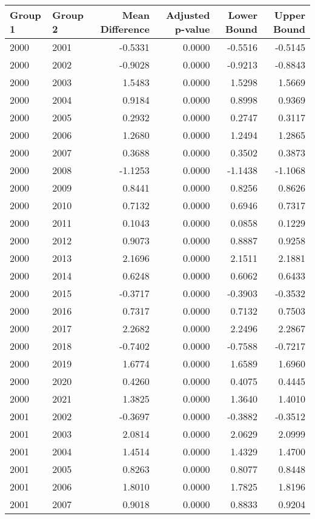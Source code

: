 \begin{tabular}{llrrrr}
\toprule
Group 1 & Group 2 & Mean Difference & Adjusted p-value & Lower Bound & Upper Bound \\
\midrule
2000 & 2001 & -0.5331 & 0.0000 & -0.5516 & -0.5145 \\
2000 & 2002 & -0.9028 & 0.0000 & -0.9213 & -0.8843 \\
2000 & 2003 & 1.5483 & 0.0000 & 1.5298 & 1.5669 \\
2000 & 2004 & 0.9184 & 0.0000 & 0.8998 & 0.9369 \\
2000 & 2005 & 0.2932 & 0.0000 & 0.2747 & 0.3117 \\
2000 & 2006 & 1.2680 & 0.0000 & 1.2494 & 1.2865 \\
2000 & 2007 & 0.3688 & 0.0000 & 0.3502 & 0.3873 \\
2000 & 2008 & -1.1253 & 0.0000 & -1.1438 & -1.1068 \\
2000 & 2009 & 0.8441 & 0.0000 & 0.8256 & 0.8626 \\
2000 & 2010 & 0.7132 & 0.0000 & 0.6946 & 0.7317 \\
2000 & 2011 & 0.1043 & 0.0000 & 0.0858 & 0.1229 \\
2000 & 2012 & 0.9073 & 0.0000 & 0.8887 & 0.9258 \\
2000 & 2013 & 2.1696 & 0.0000 & 2.1511 & 2.1881 \\
2000 & 2014 & 0.6248 & 0.0000 & 0.6062 & 0.6433 \\
2000 & 2015 & -0.3717 & 0.0000 & -0.3903 & -0.3532 \\
2000 & 2016 & 0.7317 & 0.0000 & 0.7132 & 0.7503 \\
2000 & 2017 & 2.2682 & 0.0000 & 2.2496 & 2.2867 \\
2000 & 2018 & -0.7402 & 0.0000 & -0.7588 & -0.7217 \\
2000 & 2019 & 1.6774 & 0.0000 & 1.6589 & 1.6960 \\
2000 & 2020 & 0.4260 & 0.0000 & 0.4075 & 0.4445 \\
2000 & 2021 & 1.3825 & 0.0000 & 1.3640 & 1.4010 \\
2001 & 2002 & -0.3697 & 0.0000 & -0.3882 & -0.3512 \\
2001 & 2003 & 2.0814 & 0.0000 & 2.0629 & 2.0999 \\
2001 & 2004 & 1.4514 & 0.0000 & 1.4329 & 1.4700 \\
2001 & 2005 & 0.8263 & 0.0000 & 0.8077 & 0.8448 \\
2001 & 2006 & 1.8010 & 0.0000 & 1.7825 & 1.8196 \\
2001 & 2007 & 0.9018 & 0.0000 & 0.8833 & 0.9204 \\

\end{tabular}
